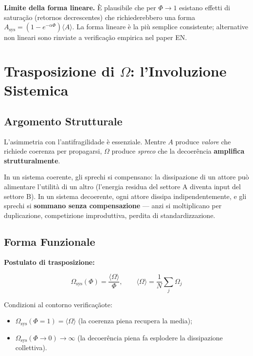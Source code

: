 \Conj{} \textbf{Limite della forma lineare.} È plausibile che per
\(\Phi \to 1\) esistano effetti di saturação (retornos decrescentes)
che richiederebbero una forma
\(A_{\text{sys}} = (1 - e^{-\alpha\Phi})\langle A \rangle\). La forma
lineare è la più semplice consistente; alternative non lineari sono
rinviate a verificação empirica nel paper EN.



\section{Trasposizione di $\Omega$: l'Involuzione
Sistemica}\label{trasposizione-di-ux3c9-linvolução-sistemica}

\subsection{Argomento Strutturale}\label{argomento-estrutural-1}

L'asimmetria con l'antifragilidade è essenziale. Mentre \(A\) produce
\emph{valore} che richiede coerenza per propagarsi, \(\Omega\) produce
\emph{spreco} che la decoerência \textbf{amplifica strutturalmente}.

In un sistema coerente, gli sprechi si compensano: la dissipazione di un
attore può alimentare l'utilità di un altro (l'energia residua del
settore A diventa input del settore B). In un sistema decoerente, ogni
attore dissipa indipendentemente, e gli sprechi si \textbf{sommano senza
compensazione} --- anzi si moltiplicano per duplicazione, competizione
improduttiva, perdita di standardizzazione.

\subsection{Forma Funzionale}\label{forma-funzionale-1}

\Hypoth{} \textbf{Postulato di trasposizione:}

\[
\Omega_{\text{sys}}(\Phi) = \frac{\langle \Omega \rangle}{\Phi}, \qquad \langle \Omega \rangle = \frac{1}{N}\sum_j \Omega_j
\]

Condizioni al contorno verificaçãote:

\begin{itemize}
\tightlist
\item
  \(\Omega_{\text{sys}}(\Phi = 1) = \langle \Omega \rangle\) (la
  coerenza piena recupera la media);
\item
  \(\Omega_{\text{sys}}(\Phi \to 0) \to \infty\) (la decoerência piena fa
  esplodere la dissipazione collettiva).
\end{itemize}

